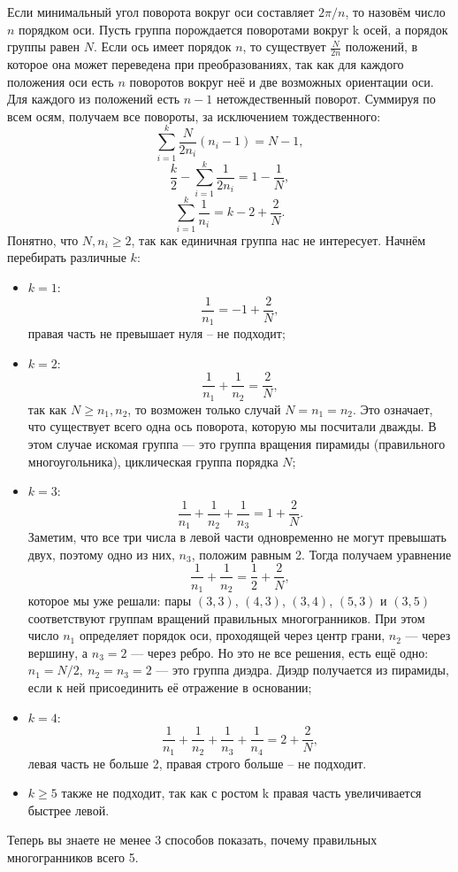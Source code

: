 \documentclass{ncc}
\begin{document}
Если минимальный угол поворота вокруг оси составляет \( 2\pi/n \), то назовём число \(n\) порядком оси. Пусть группа порождается поворотами вокруг k осей, а порядок группы равен \(N\). Если ось имеет порядок \(n\), то существует \( \frac{N}{2n} \) положений, в которое она может переведена при преобразованиях, так как для каждого положения оси есть \(n\) поворотов вокруг неё и две возможных ориентации оси. Для каждого из положений есть \( n-1 \) нетождественный поворот. Суммируя по всем осям, получаем все повороты, за исключением тождественного:
\[
    \sum_{i=1}^k \frac{N}{2n_i}(n_i-1) = N - 1,
\]
\[
    \frac{k}{2} - \sum_{i=1}^k \frac{1}{2n_i} = 1 - \frac{1}{N},
\]
\[
    \sum_{i=1}^k \frac{1}{n_i} = k - 2 + \frac{2}{N}.
\]
Понятно, что \( N, n_i \ge 2 \), так как единичная группа нас не интересует. Начнём перебирать различные \( k \):
\begin{itemize}
  \item \(k=1\): \[ \frac{1}{n_1} = -1 + \frac{2}{N}, \]  правая часть не превышает нуля -- не подходит;
  \item \(k=2\): \[ \frac{1}{n_1} + \frac{1}{n_2} = \frac{2}{N}, \]  так как \( N \ge n_1, n_2 \), то возможен только случай \(N=n_1=n_2\). Это означает, что существует всего одна ось поворота, которую мы посчитали дважды. В этом случае искомая группа --- это группа вращения пирамиды (правильного многоугольника), циклическая группа порядка \( N \);
  \item \(k=3\): \[ \frac{1}{n_1} + \frac{1}{n_2} + \frac{1}{n_3} = 1 + \frac{2}{N}. \]  Заметим, что все три числа в левой части одновременно не могут превышать двух, поэтому одно из них, \(n_3\), положим равным 2. Тогда получаем уравнение \[ \frac{1}{n_1} + \frac{1}{n_2} = \frac{1}{2} + \frac{2}{N}, \] которое мы уже решали: пары \( (3,3) \), \( (4,3) \), \( (3,4) \), \( (5,3) \) и \( (3,5) \) соответствуют группам вращений правильных многогранников. При этом число \( n_1 \) определяет порядок оси, проходящей через центр грани, \( n_2 \) --- через вершину, а \(n_3 = 2\) --- через ребро.
Но это не все решения, есть ещё одно: \( n_1 = N/2,\ n_2=n_3=2 \) --- это группа диэдра. Диэдр получается из пирамиды, если к ней присоединить её отражение в основании;
  \item \(k=4\): \[ \frac{1}{n_1} + \frac{1}{n_2} + \frac{1}{n_3} + \frac{1}{n_4} = 2 + \frac{2}{N}, \]  левая часть не больше 2, правая строго больше -- не подходит.
  \item \(k \ge 5 \) также не подходит, так как с ростом k правая часть увеличивается быстрее левой.
\end{itemize}

Теперь вы знаете не менее 3 способов показать, почему правильных многогранников всего 5.
\end{document}
